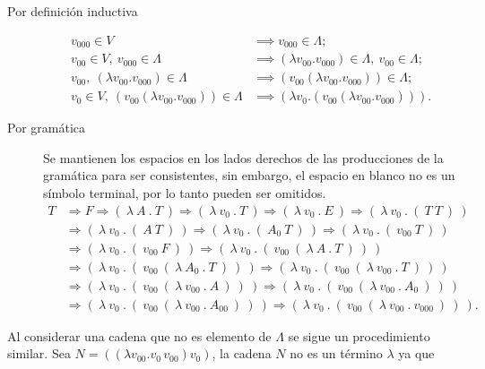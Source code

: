   \begin{description}
  \item[Por definición inductiva]
    \begin{align*}
      v_{000} \in V &\implies v_{000} \in Λ; \\
      v_{00} \in V,\ v_{000} \in Λ &\implies (λv_{00}.v_{000}) \in Λ,\ v_{00} \in Λ; \\
      v_{00},\ (λv_{00}.v_{000}) \in Λ &\implies (v_{00} (λv_{00}.v_{000})) \in Λ; \\
      v_{0} \in V,\ (v_{00} (λv_{00}.v_{000})) \in Λ &\implies (λv_{0}.(v_{00} (λv_{00}.v_{000}))).
    \end{align*}
  \item[Por gramática] Se mantienen los espacios en los lados derechos de las producciones de la gramática para ser consistentes, sin embargo, el espacio en blanco no es un símbolo terminal, por lo tanto pueden ser omitidos.
    \begin{align*}
      T &\Rightarrow F \Rightarrow (\ λ\ A\ .\ T\ ) \Rightarrow (\ λ\ v_{0}\ .\ T\ ) \Rightarrow (\ λ\ v_{0}\ .\ E\ ) \Rightarrow (\ λ\ v_{0}\ .\ (\ T\ T\ )\ ) \\
        &\Rightarrow (\ λ\ v_{0}\ .\ (\ A\ T\ )\ ) \Rightarrow (\ λ\ v_{0}\ .\ (\ A_{0}\ T\ )\ ) \Rightarrow (\ λ\ v_{0}\ .\ (\ v_{00}\ T\ )\ ) \\
        &\Rightarrow (\ λ\ v_{0}\ .\ (\ v_{00}\ F\ )\ ) \Rightarrow (\ λ\ v_{0}\ .\ (\ v_{00}\ (\ λ\ A\ .\ T\ )\ )\ ) \\
        &\Rightarrow (\ λ\ v_{0}\ .\ (\ v_{00}\ (\ λ\ A_{0}\ .\ T\ )\ )\ ) \Rightarrow (\ λ\ v_{0}\ .\ (\ v_{00}\ (\ λ\ v_{00}\ .\ T\ )\ )\ ) \\
        &\Rightarrow (\ λ\ v_{0}\ .\ (\ v_{00}\ (\ λ\ v_{00}\ .\ A\ )\ )\ ) \Rightarrow (\ λ\ v_{0}\ .\ (\ v_{00}\ (\ λ\ v_{00}\ .\ A_{0}\ )\ )\ ) \\
        &\Rightarrow (\ λ\ v_{0}\ .\ (\ v_{00}\ (\ λ\ v_{00}\ .\ A_{00}\ )\ )\ ) \Rightarrow (\ λ\ v_{0}\ .\ (\ v_{00}\ (\ λ\ v_{00}\ .\ v_{000}\ )\ )\ ).
    \end{align*}
  \end{description}

Al considerar una cadena que no es elemento de \( Λ \) se sigue un procedimiento similar. Sea \( N = ((λv_{00}.v_{0}\, v_{00}) v_{0}) \), la cadena \( N \) no es un término \( λ \) ya que


